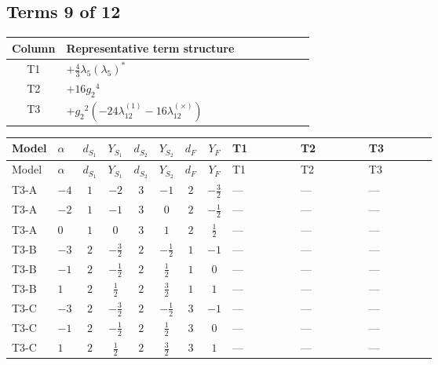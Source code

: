 \documentclass[8pt]{article}
\begin{document}
\begin{landscape}
\subsection*{Terms 9 of 12}
\begin{center}
\begin{tabular}{@{}c >{\raggedright\arraybackslash}p{0.82\linewidth}@{}}
\toprule
Column & Representative term structure \\
\midrule
T1 & \(\displaystyle +\frac{4}{3} {\lambda_5} \left({\lambda_5}\right)^{*}\) \\
\midrule
T2 & \(\displaystyle +16 {g_2}^4\) \\
\midrule
T3 & \(\displaystyle +{g_2}^2 (-24 {\lambda_{12}^{(1)}}-16 {\lambda_{12}^{(\times)}})\) \\
\midrule
\bottomrule
\end{tabular}
\end{center}
\smallskip
\tiny
\begin{longtable}{@{}llcccccc >{\raggedright\arraybackslash}p{0.21\linewidth} >{\raggedright\arraybackslash}p{0.21\linewidth} >{\raggedright\arraybackslash}p{0.21\linewidth}@{}}
\toprule
Model & $\alpha$ & $d_{S_1}$ & $Y_{S_1}$ & $d_{S_2}$ & $Y_{S_2}$ & $d_F$ & $Y_F$ & T1 & T2 & T3 \\
\midrule
\endfirsthead
\toprule
Model & $\alpha$ & $d_{S_1}$ & $Y_{S_1}$ & $d_{S_2}$ & $Y_{S_2}$ & $d_F$ & $Y_F$ & T1 & T2 & T3 \\
\midrule
\endhead
T3-A & $-4$ & $1$ & $-2$ & $3$ & $-1$ & $2$ & $-\frac{3}{2}$ & --- & --- & --- \\
\midrule
T3-A & $-2$ & $1$ & $-1$ & $3$ & $0$ & $2$ & $-\frac{1}{2}$ & --- & --- & --- \\
\midrule
T3-A & $0$ & $1$ & $0$ & $3$ & $1$ & $2$ & $\frac{1}{2}$ & --- & --- & --- \\
\midrule
T3-B & $-3$ & $2$ & $-\frac{3}{2}$ & $2$ & $-\frac{1}{2}$ & $1$ & $-1$ & --- & --- & --- \\
\midrule
T3-B & $-1$ & $2$ & $-\frac{1}{2}$ & $2$ & $\frac{1}{2}$ & $1$ & $0$ & --- & --- & --- \\
\midrule
T3-B & $1$ & $2$ & $\frac{1}{2}$ & $2$ & $\frac{3}{2}$ & $1$ & $1$ & --- & --- & --- \\
\midrule
T3-C & $-3$ & $2$ & $-\frac{3}{2}$ & $2$ & $-\frac{1}{2}$ & $3$ & $-1$ & --- & --- & --- \\
\midrule
T3-C & $-1$ & $2$ & $-\frac{1}{2}$ & $2$ & $\frac{1}{2}$ & $3$ & $0$ & --- & --- & --- \\
\midrule
T3-C & $1$ & $2$ & $\frac{1}{2}$ & $2$ & $\frac{3}{2}$ & $3$ & $1$ & --- & --- & --- \\

\end{longtable}
\end{landscape}
\end{document}
